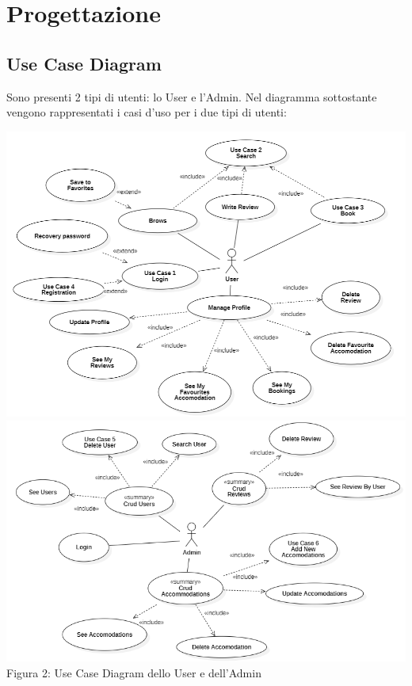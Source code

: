 \documentclass[10pt]{article}
\begin{document}
\section{Progettazione}
\subsection{Use Case Diagram}

Sono presenti 2 tipi di utenti: lo User e l'Admin. Nel diagramma sottostante vengono rappresentati i casi d'uso per i due tipi di utenti: 

\begin{center}
\includegraphics[scale=0.5]{usecases/ClientUseCase}
\includegraphics[scale=0.5]{usecases/AdminUseCase}\\
Figura 2: Use Case Diagram dello User e dell'Admin
\end{center}

\label{usecase}
\end{document}
